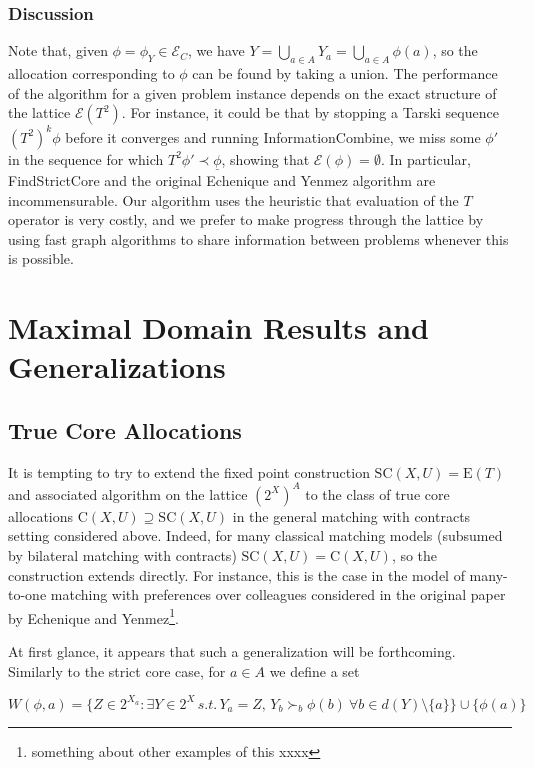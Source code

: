 \documentclass[11pt,reqno]{amsart}
\theoremstyle{definition}
\numberwithin{equation}{section}
\newcommand{\ul}{\underline}
\newcommand{\pre}{\phi}
\newcommand{\prealloc}{(2^X)^A}
\newcommand{\strcore}{\mathrm{SC}(X,U)}
\newcommand{\core}{\mathrm{C}(X,U)}
\newcommand{\fecon}{\mathrm{E}}
\newcommand{\fix}{\mathcal{E}}
\newcommand{\su}{\succ}
\newcommand{\pe}{\prec}
\newcommand{\bopre}{\ul{\pre}}
\newcommand{\fixfind}{\mathcal{E}_C}
\begin{document}
\subsubsection{Discussion} 
Note that, given $\pre = \pre_Y \in \fixfind$, we have $Y = \bigcup_{a \in A} Y_a = \bigcup_{a \in A} \pre(a)$, so the allocation corresponding to $\pre$ can be found by taking a union.
The performance of the algorithm for a given problem instance depends on the exact structure of the lattice $\fix(T^2)$.
For instance, it could be that by stopping a Tarski sequence $(T^2)^k \pre$ before it converges and running InformationCombine, we miss some $\pre'$ in the sequence for which $T^2 \pre' \pe \bopre$, showing that $\fix(\pre) = \emptyset$. 
In particular, FindStrictCore and the original Echenique and Yenmez algorithm are incommensurable. 
Our algorithm uses the heuristic that evaluation of the $T$ operator is very costly, and we prefer to make progress through the lattice by using fast graph algorithms to share information between problems whenever this is possible. 

\section{Maximal Domain Results and Generalizations} 
\subsection{True Core Allocations}
It is tempting to try to extend the fixed point construction $\strcore = \fecon(T)$ and associated algorithm on the lattice $\prealloc$ to the class of true core allocations $\core \supseteq \strcore$ in the general matching with contracts setting considered above. 
Indeed, for many classical matching models (subsumed by bilateral matching with contracts) $\strcore = \core$, so the construction extends directly.
For instance, this is the case in the model of many-to-one matching with preferences over colleagues considered in the original paper by Echenique and Yenmez\footnote{something about other examples of this xxxx}.

At first glance, it appears that such a generalization will be forthcoming. 
Similarly to the strict core case, for $a \in A$ we define a set 

\[
W(\pre, a) = \{Z \in 2^{X_a}: \exists Y \in 2^X \, s.t. \,  Y_a = Z, \, Y_b \su_b \pre(b) \: \forall b \in d(Y)\setminus\{a\} \} \cup \{\pre(a)\}
\]
\end{document}
